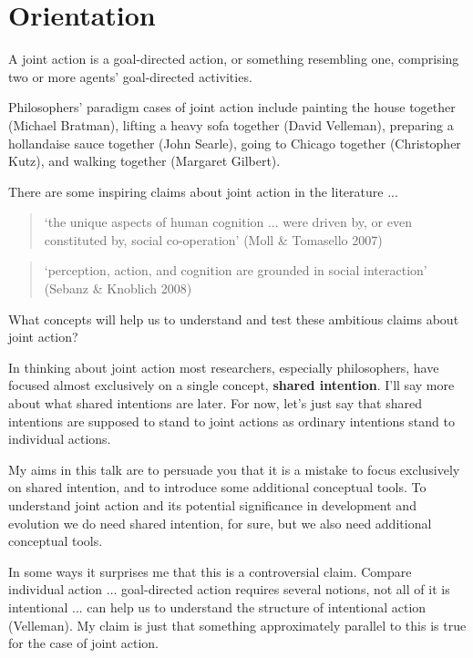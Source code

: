 \documentclass[12pt,a4paper]{extarticle}
\begin{document}
\setlength\footnotesep{1em}


\maketitle



\section{Orientation}
A joint action is a goal-directed action, or something resembling one, comprising two or more agents' goal-directed activities. 

Philosophers' paradigm cases of joint action include painting the house together (Michael Bratman), lifting a heavy sofa together (David Velleman), preparing a hollandaise sauce together (John Searle), going to Chicago together (Christopher Kutz), and walking together (Margaret Gilbert).


There are some inspiring claims about joint action in the literature ...
%
\begin{quote} 
`the unique aspects of human cognition ... were driven by, or even constituted by, social co-operation'
(Moll \& Tomasello 2007)
\end{quote}
%
\begin{quote} 
`perception, action, and cognition are grounded in social interaction'
(Sebanz \& Knoblich 2008)
\end{quote}
%
What concepts will help us to understand and test these ambitious claims about joint action?

In thinking about joint action most researchers, especially philosophers, have focused almost exclusively on a single concept, \textbf{shared intention}.  
I'll say more about what shared intentions are later.  For now, let's just say that shared intentions are supposed to stand to joint actions as ordinary intentions stand to individual actions.

My aims in this talk are to persuade you that it is a mistake to focus exclusively on shared intention, and to introduce some  additional conceptual tools.  
To understand joint action and its potential significance in development and evolution we do need shared intention, for sure, but we also need additional conceptual tools.

In some ways it surprises me that this is a controversial claim.
Compare individual action ... goal-directed action requires several notions, not all of it is intentional ... can help us to understand the structure of intentional action (Velleman).  
My claim is just that something approximately parallel to this is true for the case of joint action.
\end{document}
